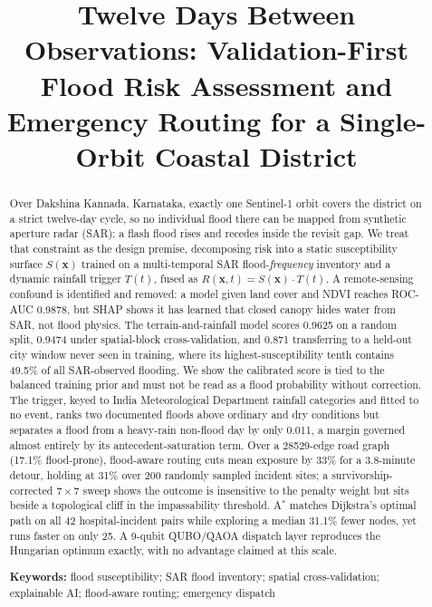 \documentclass[11pt,a4paper]{article}
\title{\bfseries Twelve Days Between Observations: Validation-First Flood Risk
Assessment and Emergency Routing for a Single-Orbit Coastal District}
\author{}
\date{}
\newcommand{\Sx}{S(\mathbf{x})}
\newcommand{\Tt}{T(t)}
\newcommand{\Rxt}{R(\mathbf{x},t)}
\begin{document}
\maketitle

\begin{abstract}
\noindent
Over Dakshina Kannada, Karnataka, exactly one Sentinel-1 orbit covers the
district on a strict twelve-day cycle, so no individual flood there can be mapped
from synthetic aperture radar (SAR): a flash flood rises and recedes inside the
revisit gap. We treat that constraint as the design premise, decomposing risk
into a static susceptibility surface $\Sx$ trained on a multi-temporal SAR
flood-\emph{frequency} inventory and a dynamic rainfall trigger $\Tt$, fused as
$\Rxt=\Sx\cdot\Tt$. A remote-sensing confound is identified and removed: a model
given land cover and NDVI reaches ROC-AUC 0.9878, but SHAP shows it has learned
that closed canopy hides water from SAR, not flood physics. The
terrain-and-rainfall model scores 0.9625 on a random split, 0.9474 under
spatial-block cross-validation, and 0.871 transferring to a held-out city window
never seen in training, where its highest-susceptibility tenth contains 49.5\% of
all SAR-observed flooding. We show the calibrated score is tied to the balanced
training prior and must not be read as a flood probability without correction.
The trigger, keyed to India Meteorological Department rainfall categories and
fitted to no event, ranks two documented floods above ordinary and dry conditions
but separates a flood from a heavy-rain non-flood day by only 0.011, a margin
governed almost entirely by its antecedent-saturation term. Over a
\num{28529}-edge road graph (17.1\% flood-prone), flood-aware routing cuts mean
exposure by 33\% for a 3.8-minute detour, holding at 31\% over 200 randomly
sampled incident sites; a survivorship-corrected $7\times7$ sweep shows the
outcome is insensitive to the penalty weight but sits beside a topological cliff
in the impassability threshold. A$^\ast$ matches Dijkstra's optimal path on all
42 hospital-incident pairs while exploring a median 31.1\% fewer nodes, yet runs
faster on only 25. A 9-qubit QUBO/QAOA dispatch layer reproduces the Hungarian
optimum exactly, with no advantage claimed at this scale.

\vspace{6pt}
\noindent\textbf{Keywords:} flood susceptibility; SAR flood inventory; spatial
cross-validation; explainable AI; flood-aware routing; emergency dispatch
\end{abstract}
\end{document}

